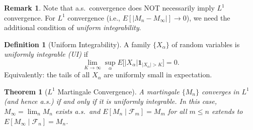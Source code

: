 \documentclass[12pt, a4paper]{article}
\theoremstyle{definition}
\newtheorem{definition}{Definition}[section]
\newtheorem{remark}{Remark}[section]
\theoremstyle{plain}
\newtheorem{theorem}{Theorem}[section]
\begin{document}
\begin{remark}
Note that a.s.\ convergence does NOT necessarily imply $L^1$ convergence. For $L^1$ convergence (i.e., $E[|M_n - M_\infty|] \to 0$), we need the additional condition of \emph{uniform integrability}.
\end{remark}

\begin{definition}[Uniform Integrability]
A family $\{X_\alpha\}$ of random variables is \emph{uniformly integrable (UI)} if
\[
  \lim_{K \to \infty} \sup_\alpha E\bigl[|X_\alpha| \mathbf{1}_{|X_\alpha| > K}\bigr] = 0.
\]
Equivalently: the tails of all $X_\alpha$ are uniformly small in expectation.
\end{definition}

\begin{theorem}[$L^1$ Martingale Convergence]
A martingale $\{M_n\}$ converges in $L^1$ (and hence a.s.) if and only if it is uniformly integrable. In this case, $M_\infty = \lim_n M_n$ exists a.s.\ and $E[M_n \mid \mathcal{F}_m] = M_m$ for all $m \leq n$ extends to $E[M_\infty \mid \mathcal{F}_n] = M_n$.
\end{theorem}
\end{document}
